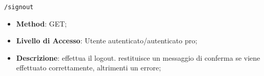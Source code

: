 	\item \texttt{/signout}
		\begin{itemize}
			\item \textbf{Method}: GET;
			\item \textbf{Livello di Accesso}: Utente autenticato/autenticato pro;
			\item \textbf{Descrizione}: effettua il logout. restituisce un messaggio di conferma se viene effettuato correttamente, altrimenti un errore;
		\end{itemize}
